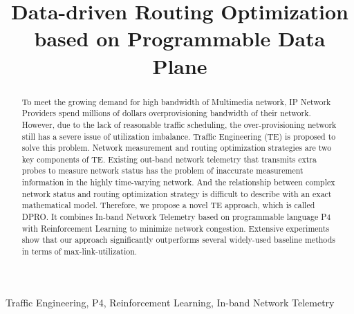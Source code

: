 \documentclass[10pt,conference]{IEEEtran}
\begin{document}
\author{
}

\title{Data-driven Routing Optimization based on Programmable Data Plane}

\maketitle

\begin{abstract}
To meet the growing demand for high bandwidth of Multimedia network, IP Network Providers spend millions of dollars overprovisioning bandwidth of their network. However, due to the lack of reasonable traffic scheduling, the over-provisioning network still has a severe issue of utilization imbalance. Traffic Engineering (TE) is proposed to solve this problem. Network measurement and routing optimization strategies are two key components of TE. Existing out-band network telemetry that transmits extra probes to measure network status has the problem of inaccurate measurement information in the highly time-varying network. And the relationship between complex network status and routing optimization strategy is difficult to describe with an exact mathematical model. Therefore, we propose a novel TE approach, which is called DPRO. It combines In-band Network Telemetry based on programmable language P4 with Reinforcement Learning to minimize network congestion. Extensive experiments show that our approach significantly outperforms several widely-used baseline methods in terms of max-link-utilization.
\end{abstract}
\begin{IEEEkeywords}
Traffic Engineering, P4, Reinforcement Learning, In-band Network Telemetry
\end{IEEEkeywords}
\end{document}
